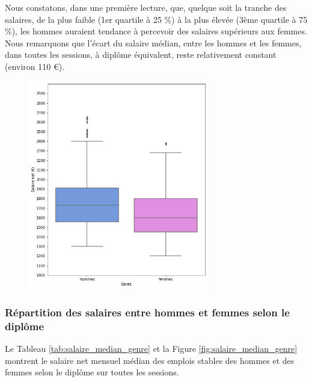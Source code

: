 \documentclass[12pt, a4paper, titlepage, table]{article}
\begin{document}
	
	Nous constatons, dans une première lecture, que, quelque soit la tranche des salaires, de la plus faible (1er quartile à 25 \%) à la plus élevée (3ème quartile à 75 \%), les hommes auraient tendance à percevoir des salaires supérieurs aux femmes. Nous remarquons que l'écart du salaire médian, entre les hommes et les femmes, dans toutes les sessions, à diplôme équivalent, reste relativement constant (environ 110 €).
		
	
	\begin{figure}[H]
		\centering
		\includegraphics[width=0.7\textwidth]{../graphs/boxplot_salaire_genre.png}
		\label{fig:boxplot_salaire_genre}
	\end{figure}
	
	\subsubsection{Répartition des salaires entre hommes et femmes selon le diplôme}
	Le Tableau \ref{tab:salaire_median_genre} et la Figure \ref{fig:salaire_median_genre} montrent le salaire net mensuel médian des emplois stables des hommes et des femmes selon le diplôme sur toutes les sessions. 
	
\end{document}
